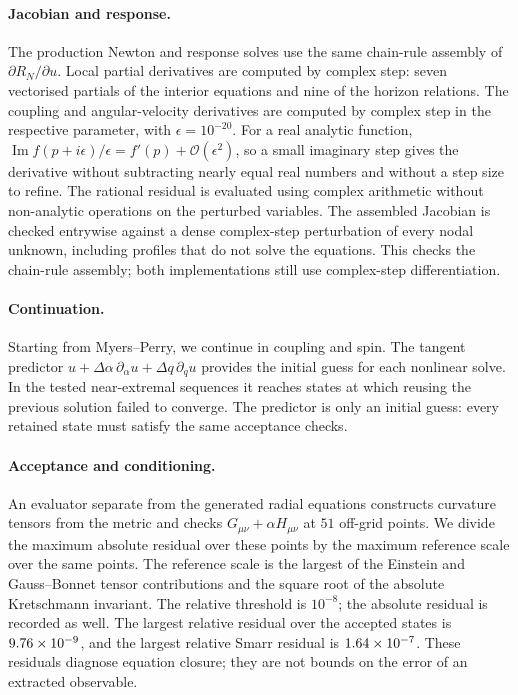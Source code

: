 \documentclass[11pt,a4paper]{article}
\begin{document}
\paragraph{Jacobian and response.}
The production Newton and response solves use the same chain-rule
assembly of $\partial R_N/\partial u$. Local partial derivatives
are computed by complex step: seven vectorised partials of the
interior equations and nine of the horizon relations.
The coupling and angular-velocity derivatives are computed by
complex step in the respective parameter, with $\epsilon=10^{-20}$.
For a real analytic function,
$\operatorname{Im}f(p+i\epsilon)/\epsilon=f'(p)+\mathcal O(\epsilon^2)$, so a
small imaginary step gives the derivative without subtracting nearly equal real
numbers and without a step size to refine.
The rational residual is evaluated using complex arithmetic without
non-analytic operations on the perturbed variables.
The assembled Jacobian is checked entrywise against a dense
complex-step perturbation of every nodal unknown, including profiles
that do not solve the equations.
This checks the chain-rule assembly; both implementations still
use complex-step differentiation.

\paragraph{Continuation.}
Starting from Myers--Perry, we continue in coupling and spin.
The tangent predictor
$u+\Delta\alpha\,\partial_\alpha u+\Delta q\,\partial_q u$
provides the initial guess for each nonlinear solve.
In the tested near-extremal sequences it reaches states at which
reusing the previous solution failed to converge.
The predictor is only an initial guess: every retained state
must satisfy the same acceptance checks.

\paragraph{Acceptance and conditioning.}
An evaluator separate from the generated radial equations constructs
curvature tensors from the metric and checks
$G_{\mu\nu}+\alpha H_{\mu\nu}$ at $51$ off-grid points.
We divide the maximum absolute residual over these points by the
maximum reference scale over the same points. The reference scale is
the largest of the Einstein and Gauss--Bonnet tensor contributions
and the square root of the absolute Kretschmann invariant.
The relative threshold is $10^{-8}$; the absolute residual is
recorded as well. The largest relative residual over the accepted
states is $9.76\times 10^{-9}$, and the largest relative Smarr residual
is $1.64\times 10^{-7}$. These residuals diagnose equation closure; they
are not bounds on the error of an extracted observable.
\end{document}
